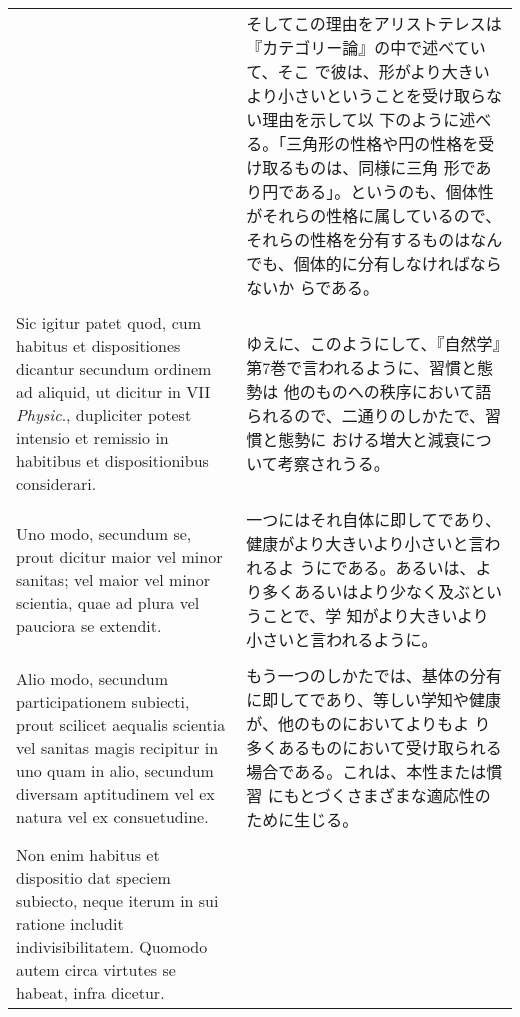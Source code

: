 \documentclass[10pt]{jsarticle} %
\begin{document}
\begin{longtable}{p{21em}p{21em}}
&

そしてこの理由をアリストテレスは『カテゴリー論』の中で述べていて、そこ
で彼は、形がより大きいより小さいということを受け取らない理由を示して以
下のように述べる。「三角形の性格や円の性格を受け取るものは、同様に三角
形であり円である」。というのも、個体性がそれらの性格に属しているので、
それらの性格を分有するものはなんでも、個体的に分有しなければならないか
らである。

\\\\


Sic igitur patet quod, cum habitus et dispositiones
dicantur secundum ordinem ad aliquid, ut dicitur in VII {\itshape Physic}.,
dupliciter potest intensio et remissio in habitibus et dispositionibus
considerari. 


&

ゆえに、このようにして、『自然学』第7巻で言われるように、習慣と態勢は
他のものへの秩序において語られるので、二通りのしかたで、習慣と態勢に
おける増大と減衰について考察されうる。


\\\\


Uno modo, secundum se, prout dicitur maior vel minor
sanitas; vel maior vel minor scientia, quae ad plura vel pauciora se
extendit. 


&

一つにはそれ自体に即してであり、健康がより大きいより小さいと言われるよ
 うにである。あるいは、より多くあるいはより少なく及ぶということで、学
 知がより大きいより小さいと言われるように。

\\\\


Alio modo, secundum participationem subiecti, prout scilicet
aequalis scientia vel sanitas magis recipitur in uno quam in alio,
secundum diversam aptitudinem vel ex natura vel ex consuetudine. 


&

もう一つのしかたでは、基体の分有に即してであり、等しい学知や健康が、他のものにおいてよりもよ
 り多くあるものにおいて受け取られる場合である。これは、本性または慣習
 にもとづくさまざまな適応性のために生じる。

\\\\


Non
enim habitus et dispositio dat speciem subiecto, neque iterum in sui
ratione includit indivisibilitatem. Quomodo autem circa virtutes se
habeat, infra dicetur.


\end{longtable}
\end{document}
